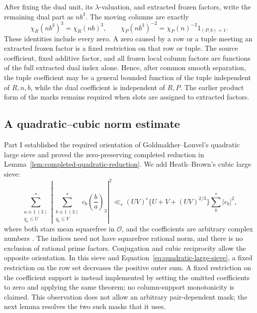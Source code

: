 \documentclass[11pt,a4paper]{article}
\numberwithin{equation}{section}
\numberwithin{figure}{section}
\theoremstyle{definition}
\theoremstyle{remark}
\begin{document}
After fixing the dual unit, its \(\lambda\)-valuation, and extracted frozen
factors, write the remaining dual part as \(nb^3\).  The moving columns are
exactly
\[
 \chi_R(nb^3)^3=\chi_R(nb)^3,\qquad
 \chi_P(nb^3)^{-2}=\chi_P(n)^{-2}1_{(P,b)=1}.
\]
These identities include every zero.  A zero caused by a row or a tuple
meeting an extracted frozen factor is a fixed restriction on that row or
tuple.  The source coefficient, fixed additive factor, and all frozen local
column factors are functions of the full extracted dual index alone.  Hence,
after common smooth separation, the tuple coefficient may be a general
bounded function of the tuple independent of \(R,n,b\), while the dual
coefficient is independent of \(R,P\).  The earlier product form of the
marks remains required when slots are assigned to extracted factors.

\subsection{A quadratic--cubic norm estimate}

Part I established the required orientation of Goldmakher--Louvel's
quadratic large sieve and proved the zero-preserving completed reduction in
Lemma~\ref{lem:completed-quadratic-reduction}.  We add Heath--Brown's cubic
large sieve:
\begin{equation}\label{eq:cubic-large-sieve}
 \sum_{\substack{a\equiv1\ (3)\\q_a\le U}}^{*}
 \left|\sum_{\substack{b\equiv1\ (3)\\q_b\le V}}^{*}
           c_b\left(\frac ba\right)_3\right|^2
 \ll_\epsilon (UV)^\epsilon
       \{U+V+(UV)^{2/3}\}\sum_b^{*}|c_b|^2,
\end{equation}
where both stars mean squarefree in \(\mathcal O\), and the coefficients
are arbitrary complex numbers \cite[Theorem 2]{HB}.  The indices need
not have squarefree rational norm, and there is no exclusion of rational
prime factors.  Conjugation and cubic reciprocity allow the opposite
orientation.  In this sieve and Equation~\eqref{eq:quadratic-large-sieve},
a fixed restriction on the row set
decreases the positive outer sum.  A fixed restriction on the coefficient
support is instead implemented by setting the omitted coefficients to zero
and applying the same theorem; no column-support monotonicity is claimed.
This observation does not allow an arbitrary pair-dependent mask; the
next lemma resolves the two such masks that it uses.
\end{document}
